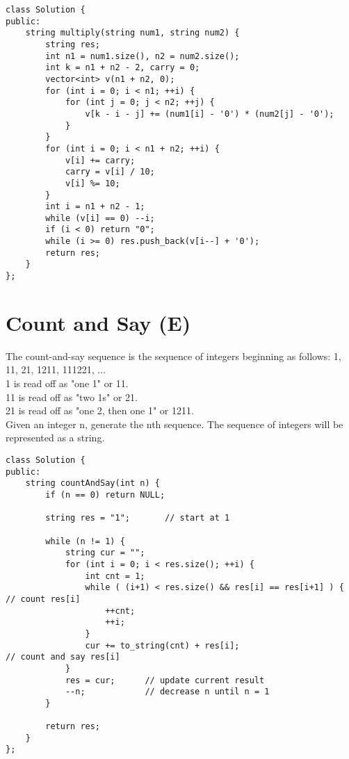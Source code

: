 \begin{lstlisting}
class Solution {
public:
    string multiply(string num1, string num2) {
        string res;
        int n1 = num1.size(), n2 = num2.size();
        int k = n1 + n2 - 2, carry = 0;
        vector<int> v(n1 + n2, 0);
        for (int i = 0; i < n1; ++i) {
            for (int j = 0; j < n2; ++j) {
                v[k - i - j] += (num1[i] - '0') * (num2[j] - '0');
            }
        }
        for (int i = 0; i < n1 + n2; ++i) {
            v[i] += carry;
            carry = v[i] / 10;
            v[i] %= 10;
        }
        int i = n1 + n2 - 1;
        while (v[i] == 0) --i;
        if (i < 0) return "0";
        while (i >= 0) res.push_back(v[i--] + '0');
        return res;
    }
};
\end{lstlisting}


\section{Count and Say (E)}
The count-and-say sequence is the sequence of integers beginning as follows: 1, 11, 21, 1211, 111221, ...\\
1 is read off as "one 1" or 11.\\
11 is read off as "two 1s" or 21.\\
21 is read off as "one 2, then one 1" or 1211.\\

Given an integer n, generate the nth sequence. The sequence of integers will be represented as a string. \\

\begin{lstlisting}
class Solution {
public:
    string countAndSay(int n) {
        if (n == 0) return NULL;
        
        string res = "1";       // start at 1
        
        while (n != 1) {
            string cur = "";
            for (int i = 0; i < res.size(); ++i) {
                int cnt = 1;
                while ( (i+1) < res.size() && res[i] == res[i+1] ) {        // count res[i]
                    ++cnt;
                    ++i;
                }
                cur += to_string(cnt) + res[i];                             // count and say res[i]
            }
            res = cur;      // update current result
            --n;            // decrease n until n = 1
        }
        
        return res;
    }
};
\end{lstlisting}


